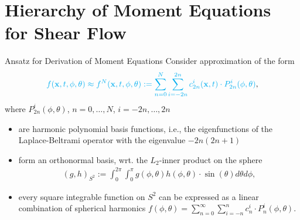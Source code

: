 \section{Hierarchy of Moment Equations for Shear Flow}
\begin{frame}{Ansatz for Derivation of Moment Equations}
	\scriptsize
    Consider approximation of the form
	\begin{align}
		\textcolor{cyan}{f(\textbf{x}, t, \phi, \theta) \approx f^N(\textbf{x},t,\phi,\theta) :=  \sum_{n=0}^{N} \sum_{i=-2n}^{2n} c^i_{2n}(\textbf{x},t) \cdot P^i_{2n}(\phi, \theta)}, \label{spectralmethod}
	\end{align}
	where $P^i_{2n}(\phi, \theta)$, $n = 0, \ldots, N$, $i = -2n, \ldots, 2n$
	\begin{itemize}
		\item are harmonic polynomial basis functions, i.e., the eigenfunctions of the Laplace-Beltrami operator with the eigenvalue $-2n(2n+1)$
		\pause
		\item form an orthonormal basis, wrt. the $L_2$-inner product on the sphere
		\begin{align*}
			(g,h)_{S^2} := \int_{0}^{2\pi} \int_{0}^{\pi} g(\phi, \theta) h(\phi, \theta) \cdot \sin(\theta) d\theta d\phi,
		\end{align*}
	\pause
	\item every square integrable function on $S^2$ can be expressed as a linear combination of spherical harmonics $f(\phi, \theta) = \sum^{\infty}_{n=0} \sum_{i=-n}^{n} c^i_{n} \cdot P^i_{n}(\phi, \theta)$.
	\end{itemize}
\end{frame}

